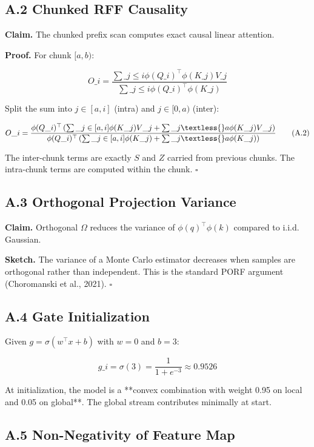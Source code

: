 \subsection{A.2 Chunked RFF Causality}

\textbf{Claim.} The chunked prefix scan computes exact causal linear attention.

\textbf{Proof.} For chunk $[a, b)$:

\[
O\_i = \frac{\sum\_{j \le i} \phi(Q\_i)^\top \phi(K\_j) V\_j}{\sum\_{j \le i} \phi(Q\_i)^\top \phi(K\_j)}
\tag{A.1}
\]

Split the sum into $j \in [a, i]$ (intra) and $j \in [0, a)$ (inter):

\[
O\_i = \frac{\phi(Q\_i)^\top \left(\sum\_{j \in [a, i]} \phi(K\_j) V\_j + \sum\_{j \textless{} a} \phi(K\_j) V\_j\right)}{\phi(Q\_i)^\top \left(\sum\_{j \in [a, i]} \phi(K\_j) + \sum\_{j \textless{} a} \phi(K\_j)\right)}
\tag{A.2}
\]

The inter-chunk terms are exactly $S$ and $Z$ carried from previous chunks. 
The intra-chunk terms are computed within the chunk. $\square$

\subsection{A.3 Orthogonal Projection Variance}

\textbf{Claim.} Orthogonal $\Omega$ reduces the variance of $\phi(q)^\top \phi(k)$ 
compared to i.i.d. Gaussian.

\textbf{Sketch.} The variance of a Monte Carlo estimator decreases when samples 
are orthogonal rather than independent. This is the standard PORF argument 
(Choromanski et al., 2021). $\square$

\subsection{A.4 Gate Initialization}

Given $g = \sigma(w^\top x + b)$ with $w = 0$ and $b = 3$:

\[
g\_i = \sigma(3) = \frac{1}{1 + e^{-3}} \approx 0.9526
\tag{A.3}
\]

At initialization, the model is a **convex combination with weight 0.95 on 
local and 0.05 on global**. The global stream contributes minimally at start.

\subsection{A.5 Non-Negativity of Feature Map}


